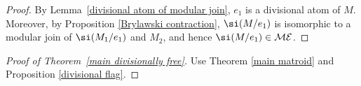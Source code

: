 \begin{proof}
By Lemma~\ref{divisional atom of modular join}, $ e_{1} $ is a divisional atom of $ M $.
Moreover, by Proposition \ref{Brylawski contraction}, $ \si(M/e_{1}) $ is isomorphic to a modular join of $ \si(M_{1}/e_{1}) $ and $ M_{2} $, and hence $ \si(M/e_{1}) \in \mathcal{ME} $.
\end{proof}

\begin{proof}[Proof of Theorem~\ref{main divisionally free}] Use Theorem \ref{main matroid} and Proposition \ref{divisional flag}.
\end{proof}
